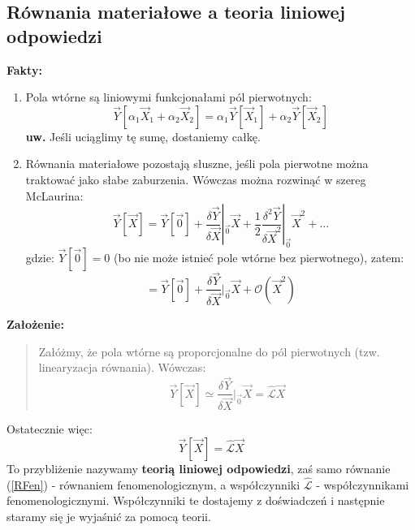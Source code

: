 \subsection{Równania materiałowe a teoria liniowej odpowiedzi}
\textbf{Fakty:}
\begin{enumerate}
\item Pola wtórne są liniowymi funkcjonałami pól pierwotnych:
\begin{equation} \vec{Y}[\alpha_1\vec{X}_1 + \alpha_2\vec{X}_2]=\alpha_1 \vec{Y}[\vec{X}_1] + \alpha_2 \vec{Y}[\vec{X}_2] \end{equation}
\textbf{uw.} Jeśli uciąglimy tę sumę, dostaniemy całkę.
\item Równania materiałowe pozostają słuszne, jeśli pola pierwotne można traktować jako słabe zaburzenia. Wówczas można rozwinąć w szereg McLaurina:
\begin{equation}\vec{Y}[\vec{X}]=\vec{Y}[\vec{0}]+ \frac{\delta\vec{Y}}{\delta\vec{X}}|_{\vec{0}}\vec{X} + \frac{1}{2}\frac{\delta^2 \vec{Y}}{\delta\vec{X}^2}|_{\vec{0}}\vec{X}^2 + ...\end{equation}
gdzie: $\vec{Y}[\vec{0}]=0$ (bo nie może istnieć pole wtórne bez pierwotnego), zatem:
\begin{equation}[\vec{X}]=\vec{Y}[\vec{0}]+ \frac{\delta\vec{Y}}{\delta\vec{X}}|_{\vec{0}}\vec{X} + \mathcal{O}(\vec{X}^2)\end{equation}
\end{enumerate}
\textbf{Założenie:}\begin{verse} 
Załóżmy, że pola wtórne są proporcjonalne do pól pierwotnych (tzw. linearyzacja równania). Wówczas:
\begin{equation}\vec{Y}[{\vec{X}}] \simeq \frac{\delta\vec{Y}}{\delta\vec{X}}|_{\vec{0}} \vec{X} = \hat{\mathcal{L}}\vec{X}\end{equation} \end{verse}
Ostatecznie więc:
\begin{equation}\vec{Y}[{\vec{X}}] = \hat{\mathcal{L}}\vec{X} \label{RFen} \end{equation}
To przybliżenie nazywamy \textbf{teorią liniowej odpowiedzi}, zaś samo równanie (\ref{RFen}) - równaniem fenomenologicznym, a współczynniki $\hat{\mathcal{L}}$ - współczynnikami fenomenologicznymi. Współczynniki te dostajemy z doświadczeń i następnie staramy się je wyjaśnić za pomocą teorii.

